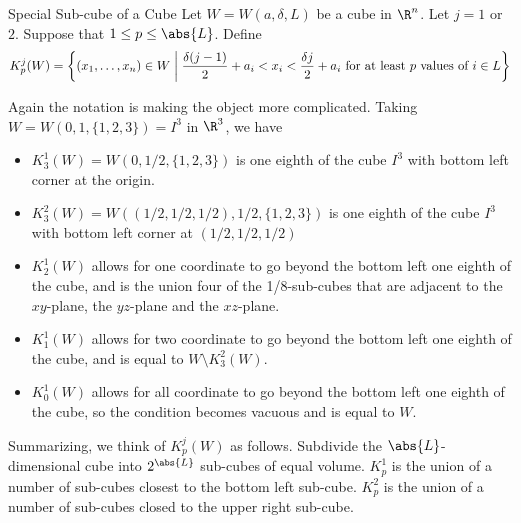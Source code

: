 \documentclass[a4paper]{article}
\begin{document}
\begin{defn}{Special Sub-cube of a Cube}{} Let $W=W(a,\delta,L)$ be a cube in $\R^n$. Let $j=1$ or $2$. Suppose that $1\leq p\leq\abs{L}$. Define $$K_p^j(W)=\left\{(x_1,\dots,x_n)\in W\;\bigg{|}\;\frac{\delta(j-1)}{2}+a_i<x_i<\frac{\delta j}{2}+a_i\text{ for at least }p\text{ values of }i\in L\right\}$$
\end{defn}

Again the notation is making the object more complicated. Taking $W=W(0,1,\{1,2,3\})=I^3$ in $\R^3$, we have 
\begin{itemize}
\item $K_3^1(W)=W(0,1/2,\{1,2,3\})$ is one eighth of the cube $I^3$ with bottom left corner at the origin. 
\item $K_3^2(W)=W((1/2,1/2,1/2),1/2,\{1,2,3\})$ is one eighth of the cube $I^3$ with bottom left corner at $(1/2,1/2,1/2)$
\item $K_2^1(W)$ allows for one coordinate to go beyond the bottom left one eighth of the cube, and is the union four of the 1/8-sub-cubes that are adjacent to the $xy$-plane, the $yz$-plane and the $xz$-plane. 
\item $K_1^1(W)$ allows for two coordinate to go beyond the bottom left one eighth of the cube, and is equal to $W\setminus K_3^2(W)$. 
\item $K_0^1(W)$ allows for all coordinate to go beyond the bottom left one eighth of the cube, so the condition becomes vacuous and is equal to $W$. 
\end{itemize}

Summarizing, we think of $K_p^j(W)$ as follows. Subdivide the $\abs{L}$-dimensional cube into $2^\abs{L}$ sub-cubes of equal volume. $K_p^1$ is the union of a number of sub-cubes closest to the bottom left sub-cube. $K_p^2$ is the union of a number of sub-cubes closed to the upper right sub-cube. 
\end{document}
